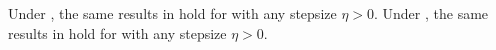 

\begin{theorem}
\label{thm: directional convergence-gd}
Under , the same results in  hold for  with any stepsize $\eta>0$. %
Under , the same results in  hold for  with any stepsize $\eta>0$.
\end{theorem}

